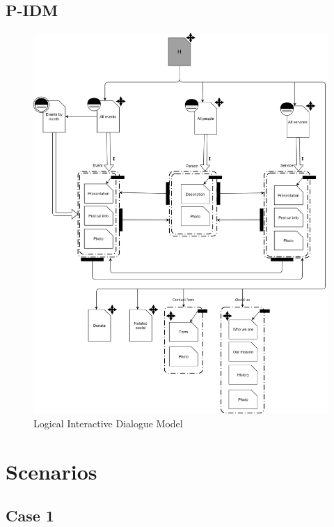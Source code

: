 \documentclass[11pt, a4paperm, hidelinks]{article}
\begin{document}
	\subsection{P-IDM}
	\begin{figure}[h!]
		\centering
		\begin{minipage}[b]{1\textwidth}
    			\includegraphics[width=\textwidth]{./assets/P-IDM.png}
			\caption{Logical Interactive Dialogue Model}
		\end{minipage}
	\end{figure}
	\clearpage


	\section{Scenarios}

	\subsection{Case 1}
	
\end{document}
